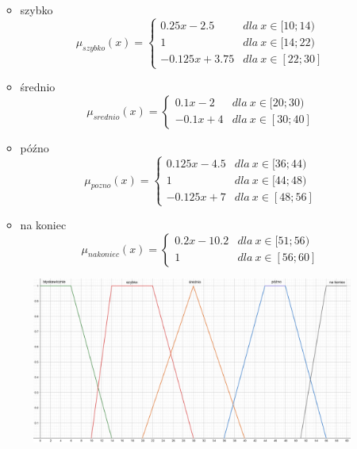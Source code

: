 \documentclass{classrep}
\begin{document}
\begin{enumerate}
\begin{itemize}
\begin{equation}
        \end{equation}
         \item szybko
        \begin{equation}
            \mu_{szybko}(x) = \left\{\begin{matrix} 0.25x - 2.5 & dla \: x\in[10;14) \\ 1 & dla \: x\in [14;22) \\ -0.125x + 3.75 & dla \: x\in [22; 30] \end{matrix}\right.
        \end{equation}
        \item średnio
        \begin{equation}
            \mu_{srednio}(x) = \left\{\begin{matrix} 0.1x - 2 & dla \: x\in[20;30) \\ -0.1x + 4 & dla \: x\in [30; 40] \end{matrix}\right.
        \end{equation}
        \item późno
        \begin{equation}
            \mu_{pozno}(x) = \left\{\begin{matrix} 0.125x - 4.5 & dla \: x\in[36;44) \\ 1 & dla \: x\in [44;48) \\ -0.125x + 7 & dla \: x\in [48; 56] \end{matrix}\right.
        \end{equation}
        \item na koniec
        \begin{equation}
            \mu_{nakoniec}(x) = \left\{\begin{matrix} 0.2x - 10.2 & dla \: x\in[51;56) \\ 1 & dla \: x\in [56;60] \end{matrix}\right.
        \end{equation}
    \end{itemize}
    \begin{figure}[H]
        \centering
        \includegraphics[width=14cm]{wykres_draft.png}

\end{figure}
\end{enumerate}
\end{document}
